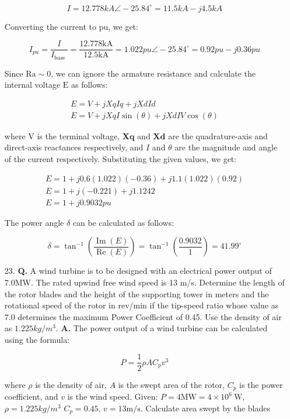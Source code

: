 \documentclass[main.tex]{subfiles}
\begin{document}
\begin{enumerate}
$$
I=12.778 k A \angle-25.84^{\circ}=11.5 k A-j 4.5 k A
$$

Converting the current to pu, we get:

$$
I_{p u}=\frac{I}{I_{\text {base }}}=\frac{12.778 \mathrm{kA}}{12.5 \mathrm{kA}}=1.022 p u \angle-25.84^{\circ}=0.92 p u-j 0.36 p u
$$

Since $\mathrm{Ra} \sim 0$, we can ignore the armature resistance and calculate the internal voltage $\mathrm{E}$ as follows:

$$
\begin{gathered}
E=V+j X q I q+j X d I d \\
E=V+j X q I \sin (\theta)+j X d I V \cos (\theta)
\end{gathered}
$$

where $\mathrm{V}$ is the terminal voltage, $\mathbf{X q}$ and $\mathbf{X d}$ are the quadrature-axis and direct-axis reactances respectively, and $I$ and $\theta$ are the magnitude and angle of the current respectively.
Substituting the given values, we get:

$$
\begin{gathered}
E=1+j 0.6(1.022)(-0.36)+j 1.1(1.022)(0.92) \\
E=1+j(-0.221)+j 1.1242 \\
E=1+j 0.9032 p u
\end{gathered}
$$

The power angle $\delta$ can be calculated as follows:

$$
\delta=\tan ^{-1}\left(\frac{\operatorname{Im}(E)}{\operatorname{Re}(E)}\right)=\tan ^{-1}\left(\frac{0.9032}{1}\right)=41.99^{\circ}
$$

\item[23.] \textbf{Q.} A wind turbine is to be designed with an electrical power output of 7.0MW. The rated upwind free wind speed is 13 m/s. Determine the length of the rotor blades and the height of the supporting tower in meters and the rotational speed of the rotor in rev/min if the tip-speed ratio whose value as 7.0 determines the maximum Power Coefficient of 0.45. Use the density of air as $\num{1.225}\unit{kg/m^3}$. \textbf{A.} The power output of a wind turbine can be calculated using the formula: 

$$
P=\frac{1}{2} \rho A C_p v^3
$$

where $\rho$ is the density of air, $A$ is the swept area of the rotor, $C_p$ is the power coefficient, and $v$ is the wind speed. Given: $P =4 \mathrm{MW}=4 \times 10^6 \mathrm{~W}$, $\rho = 1.225 \unit{kg/m^3}$ $C_p=0.45$, $v = 13 \mathrm{m} / \mathrm{s}$. Calculate area swept by the blades 


\end{enumerate}
\end{document}
